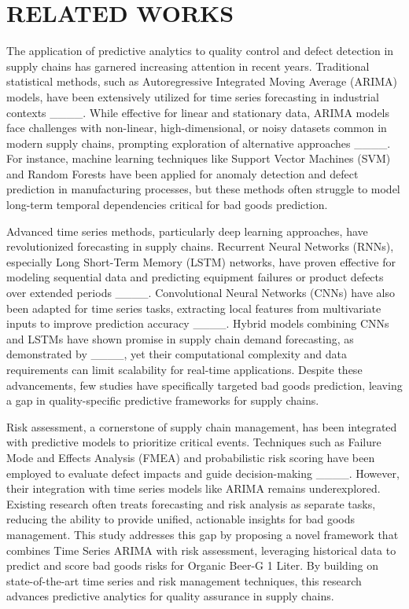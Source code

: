 \section{RELATED WORKS}
\label{sec:relatedwork}
The application of predictive analytics to quality control and defect detection in supply chains has garnered increasing attention in recent years. Traditional statistical methods, such as Autoregressive Integrated Moving Average (ARIMA) models, have been extensively utilized for time series forecasting in industrial contexts ____. While effective for linear and stationary data, ARIMA models face challenges with non-linear, high-dimensional, or noisy datasets common in modern supply chains, prompting exploration of alternative approaches ____. For instance, machine learning techniques like Support Vector Machines (SVM) and Random Forests have been applied for anomaly detection and defect prediction in manufacturing processes, but these methods often struggle to model long-term temporal dependencies critical for bad goods prediction.

Advanced time series methods, particularly deep learning approaches, have revolutionized forecasting in supply chains. Recurrent Neural Networks (RNNs), especially Long Short-Term Memory (LSTM) networks, have proven effective for modeling sequential data and predicting equipment failures or product defects over extended periods ____. Convolutional Neural Networks (CNNs) have also been adapted for time series tasks, extracting local features from multivariate inputs to improve prediction accuracy ____. Hybrid models combining CNNs and LSTMs have shown promise in supply chain demand forecasting, as demonstrated by ____, yet their computational complexity and data requirements can limit scalability for real-time applications. Despite these advancements, few studies have specifically targeted bad goods prediction, leaving a gap in quality-specific predictive frameworks for supply chains.

Risk assessment, a cornerstone of supply chain management, has been integrated with predictive models to prioritize critical events. Techniques such as Failure Mode and Effects Analysis (FMEA) and probabilistic risk scoring have been employed to evaluate defect impacts and guide decision-making ____. However, their integration with time series models like ARIMA remains underexplored. Existing research often treats forecasting and risk analysis as separate tasks, reducing the ability to provide unified, actionable insights for bad goods management. This study addresses this gap by proposing a novel framework that combines Time Series ARIMA with risk assessment, leveraging historical data to predict and score bad goods risks for Organic Beer-G 1 Liter. By building on state-of-the-art time series and risk management techniques, this research advances predictive analytics for quality assurance in supply chains.

